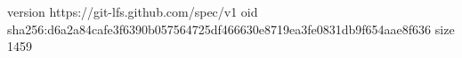 version https://git-lfs.github.com/spec/v1
oid sha256:d6a2a84cafe3f6390b057564725df466630e8719ea3fe0831db9f654aae8f636
size 1459
